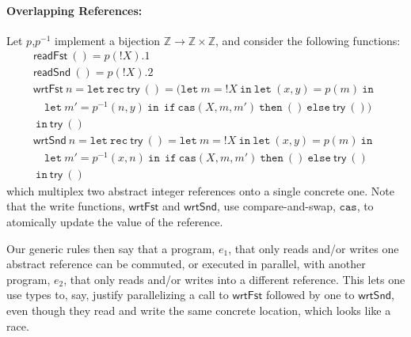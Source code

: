 \documentclass[nocopyrightspace,preprint]{sigplanconf}
\newcommand{\keywd}[1]{\mathtt{#1}}
\newcommand{\myread}[1]{!{#1}}
\newcommand{\ints}{\mathbb{Z}}
\newcommand{\letin}[2]{\keywd{let}\:{#1}\!=\!{#2}\:\keywd{in}\:}
\newcommand{\cas}[3]{\keywd{cas}( #1, #2, #3)}
\newcommand{\cloc}{\ensuremath{X}\xspace}
\begin{document}
\paragraph{Overlapping References:}
Let $p$,$p^{-1}$ implement a bijection $\ints \to \ints\times\ints$, and consider the following functions:
\[ 
\begin{array}{l}
      \mathsf{readFst}~() = p(\myread{\cloc}).1 \\
       \mathsf{readSnd}~() = p(\myread{\cloc}).2 \\
\mathsf{wrtFst}~ n =   \keywd{let \ rec}~ \mathsf{try}~() = (\keywd{let}~ m = \myread{\cloc} ~ \keywd{in}~ \letin{(x,y)}{p(m)}~ 
\\ \quad \letin{m'}{p^{-1}(n,y)} ~ \keywd{if}~\cas{\cloc}{m}{m'}~\keywd{then}~()~ \keywd{else}~\mathsf{try}~ ()) \\
  ~\keywd{in}~\mathsf{try}~() \\
  \mathsf{wrtSnd}~ n =   \keywd{let \ rec}~ \mathsf{try}~() =  \keywd{let}~ m = \myread{\cloc} ~ \keywd{in}~
 \letin{(x,y)}{p(m)}~ \\ \quad 
 \letin{m'}{p^{-1}(x,n)} ~ \keywd{if}~\cas{\cloc}{m}{m'}~\keywd{then}~()~ \keywd{else}~\mathsf{try}~ () \\  
 ~\keywd{in}~\mathsf{try}~()
\end{array}
\]
which multiplex two abstract integer references onto a single concrete one. Note that the write functions, $\mathsf{wrtFst}$ and $\mathsf{wrtSnd}$, use compare-and-swap,  $\keywd{cas}$, to atomically update the value of the reference. 



Our generic rules then say that a program, $e_1$, that only reads and/or writes one abstract  reference can be commuted, or executed in parallel, with another program, $e_2$, that only reads and/or writes into a different reference. This lets one use types to, say, justify parallelizing a call to $\mathsf{wrtFst}$ followed by one to $\mathsf{wrtSnd}$, even though they read and write the same concrete location, which looks like a race.
\end{document}
